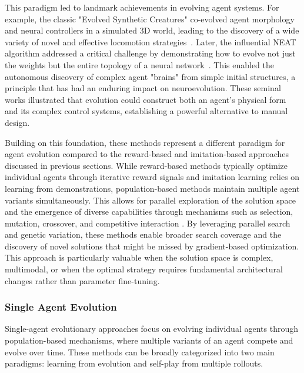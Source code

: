 This paradigm led to landmark achievements in evolving agent systems. For example, the classic "Evolved Synthetic Creatures" co-evolved agent morphology and neural controllers in a simulated 3D world, leading to the discovery of a wide variety of novel and effective locomotion strategies~\citep{karl1994evolving}. Later, the influential NEAT algorithm addressed a critical challenge by demonstrating how to evolve not just the weights but the entire topology of a neural network~\citep{stanley2002evolving}. This enabled the autonomous discovery of complex agent "brains" from simple initial structures, a principle that has had an enduring impact on neuroevolution. These seminal works illustrated that evolution could construct both an agent's physical form and its complex control systems, establishing a powerful alternative to manual design.

Building on this foundation, these methods represent a different paradigm for agent evolution compared to the reward-based and imitation-based approaches discussed in previous sections. While reward-based methods typically optimize individual agents through iterative reward signals and imitation learning relies on learning from demonstrations, population-based methods maintain multiple agent variants simultaneously. This allows for parallel exploration of the solution space and the emergence of diverse capabilities through mechanisms such as selection, mutation, crossover, and competitive interaction \citep{zhang2025nature}. By leveraging parallel search and genetic variation, these methods enable broader search coverage and the discovery of novel solutions that might be missed by gradient-based optimization. This approach is particularly valuable when the solution space is complex, multimodal, or when the optimal strategy requires fundamental architectural changes rather than parameter fine-tuning.




\subsubsection{Single Agent Evolution}

Single-agent evolutionary approaches focus on evolving individual agents through population-based mechanisms, where multiple variants of an agent compete and evolve over time. These methods can be broadly categorized into two main paradigms: learning from evolution and self-play from multiple rollouts.

